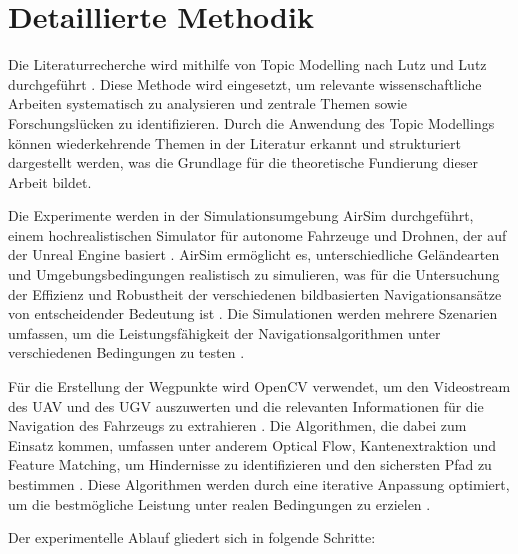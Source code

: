 
\section{Detaillierte Methodik}

Die Literaturrecherche wird mithilfe von Topic Modelling nach Lutz und Lutz durchgeführt \cite{Lutz2023TopicMA}. 
Diese Methode wird eingesetzt, um relevante wissenschaftliche Arbeiten systematisch zu analysieren und zentrale Themen sowie Forschungslücken zu identifizieren. 
Durch die Anwendung des Topic Modellings können wiederkehrende Themen in der Literatur erkannt und strukturiert dargestellt werden, was die Grundlage für die theoretische Fundierung dieser Arbeit bildet.

Die Experimente werden in der Simulationsumgebung \gls{AirSim} durchgeführt, einem hochrealistischen Simulator für autonome Fahrzeuge und Drohnen, der auf der \gls{Unreal Engine} basiert \cite{airsim2017fsr}. 
\gls{AirSim} ermöglicht es, unterschiedliche Geländearten und Umgebungsbedingungen realistisch zu simulieren, was für die Untersuchung der Effizienz und Robustheit der verschiedenen bildbasierten Navigationsansätze von entscheidender Bedeutung ist \cite{mapless:ugv:navigation}. 
Die Simulationen werden mehrere Szenarien umfassen, um die Leistungsfähigkeit der Navigationsalgorithmen unter verschiedenen Bedingungen zu testen \cite{multi:objective:ugv:navigation}.

Für die Erstellung der Wegpunkte wird \gls{OpenCV} verwendet, um den Videostream des \ac{UAV} und des \ac{UGV} auszuwerten und die relevanten Informationen für die Navigation des Fahrzeugs zu extrahieren \cite{autonomous:flight:uwb:positioning}. 
Die Algorithmen, die dabei zum Einsatz kommen, umfassen unter anderem Optical Flow, Kantenextraktion und \gls{Feature Matching}, um Hindernisse zu identifizieren und den sichersten Pfad zu bestimmen \cite{image:processing:uav:autonomous}. 
Diese Algorithmen werden durch eine iterative Anpassung optimiert, um die bestmögliche Leistung unter realen Bedingungen zu erzielen \cite{ugv:coverage:energy:efficient}.

Der experimentelle Ablauf gliedert sich in folgende Schritte:

